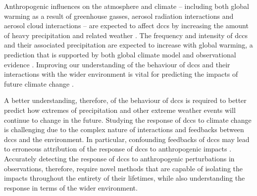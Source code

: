 Anthropogenic influences on the atmosphere and climate -- including both global warming as a result of greenhouse gasses, aerosol radiation interactions and aerosol cloud interactions -- are expected to affect \acrshort{dcc}s by increasing the amount of heavy precipitation and related weather \citep[e.g.][]{allen_constraints_2002, trenberth_changing_2003, held_robust_2006, khain2005aerosol, koren_smoke_2008, rosenfeld_flood_2008, fan_microphysical_2013, fan_review_2016}.
The frequency and intensity of \acrshort{dcc}s and their associated precipitation are expected to increase with global warming, a prediction that is supported by both global climate model \citep{allen_constraints_2002, trenberth_changing_2003, held_robust_2006, muller_energetic_2011, ogorman_energetic_2012, ogorman_precipitation_2015} and observational evidence \citep{tan_increases_2015, berg_strong_2013, aumann_increased_2018, houze_extreme_2019}.
Improving our understanding of the behaviour of \acrshort{dcc}s and their interactions with the wider environment is vital for predicting the impacts of future climate change \citep{westra_future_2014}.

A better understanding, therefore, of the behaviour of \acrshort{dcc}s is required to better predict how extremes of precipitation and other extreme weather events will continue to change in the future.
Studying the response of \acrshort{dcc}s to climate change is challenging due to the complex nature of interactions and feedbacks between \acrshort{dcc}s and the environment.
In particular, confounding feedbacks of \acrshort{dcc}s may lead to erroneous attribution of the response of \acrshort{dcc}s to anthropogenic impacts \citep{varble_erroneous_2018}.
Accurately detecting the response of \acrshort{dcc}s to anthropogenic perturbations in observations, therefore, require novel methods that are capable of isolating the impacts throughout the entirety of their lifetimes, while also understanding the response in terms of the wider environment.


